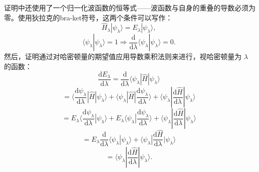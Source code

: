 证明中还使用了一个归一化波函数的恒等式——波函数与自身的重叠的导数必须为零。使用狄拉克的bra-ket符号，这两个条件可以写作：
\[
\hat{H}_{\lambda} |\psi_{\lambda} \rangle = E_{\lambda} |\psi_{\lambda} \rangle,~
\]
\[
\langle \psi_{\lambda} | \psi_{\lambda} \rangle = 1 \Rightarrow \frac{\mathrm{d}}{\mathrm{d} \lambda} \langle \psi_{\lambda} | \psi_{\lambda} \rangle = 0.~
\]
然后，证明通过对哈密顿量的期望值应用导数乘积法则来进行，视哈密顿量为 \(\lambda\) 的函数：
\[
\frac{\mathrm{d} E_{\lambda}}{\mathrm{d} \lambda} = \frac{\mathrm{d}}{\mathrm{d} \lambda} \langle \psi_{\lambda} | \hat{H} |\psi_{\lambda} \rangle~
\]
\[
= \langle \frac{\mathrm{d} \psi_{\lambda}}{\mathrm{d} \lambda} | \hat{H} | \psi_{\lambda} \rangle + \langle \psi_{\lambda} | \hat{H} | \frac{\mathrm{d} \psi_{\lambda}}{\mathrm{d} \lambda} \rangle + \langle \psi_{\lambda} | \frac{\mathrm{d} \hat{H}}{\mathrm{d} \lambda} | \psi_{\lambda} \rangle~
\]
\[
= E_{\lambda} \langle \frac{\mathrm{d} \psi_{\lambda}}{\mathrm{d} \lambda} | \psi_{\lambda} \rangle + E_{\lambda} \langle \psi_{\lambda} | \frac{\mathrm{d} \psi_{\lambda}}{\mathrm{d} \lambda} \rangle + \langle \psi_{\lambda} | \frac{\mathrm{d} \hat{H}}{\mathrm{d} \lambda} | \psi_{\lambda} \rangle~
\]
\[
= E_{\lambda} \frac{\mathrm{d}}{\mathrm{d} \lambda} \langle \psi_{\lambda} | \psi_{\lambda} \rangle + \langle \psi_{\lambda} | \frac{\mathrm{d} \hat{H}}{\mathrm{d} \lambda} | \psi_{\lambda} \rangle~
\]
\[
= \langle \psi_{\lambda} | \frac{\mathrm{d} \hat{H}}{\mathrm{d} \lambda} | \psi_{\lambda} \rangle.~
\]